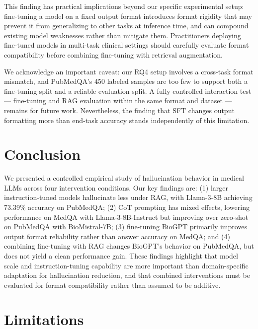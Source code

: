 \documentclass[11pt]{article}
\begin{document}
This finding has practical implications beyond our specific experimental 
setup: fine-tuning a model on a fixed output format introduces format 
rigidity that may prevent it from generalizing to other tasks at 
inference time, and can compound existing model weaknesses rather than 
mitigate them. Practitioners deploying fine-tuned models in multi-task 
clinical settings should carefully evaluate format compatibility before 
combining fine-tuning with retrieval augmentation.

We acknowledge an important caveat: our RQ4 setup involves a 
cross-task format mismatch, and PubMedQA's 450 labeled samples are 
too few to support both a fine-tuning split and a reliable evaluation 
split. A fully controlled interaction test --- fine-tuning and RAG 
evaluation within the same format and dataset --- remains for future 
work. Nevertheless, the finding that SFT changes output formatting more 
than end-task accuracy stands independently of this limitation.

\section{Conclusion}
 
We presented a controlled empirical study of hallucination behavior in 
medical LLMs across four intervention conditions. Our key findings are: 
(1) larger instruction-tuned models hallucinate less under RAG, with 
Llama-3-8B achieving 73.39\% accuracy on PubMedQA; (2) CoT prompting has 
mixed effects, lowering performance on MedQA with Llama-3-8B-Instruct 
but improving over zero-shot on PubMedQA with BioMistral-7B; (3) fine-tuning BioGPT primarily improves output format reliability rather than answer accuracy on MedQA; and (4) combining 
fine-tuning with RAG changes BioGPT's behavior on PubMedQA, but does 
not yield a clean performance gain. These findings highlight that model 
scale and instruction-tuning capability are more important than domain-specific adaptation for hallucination 
reduction, and that combined interventions must be evaluated for format 
compatibility rather than assumed to be additive.

\section{Limitations}
 
\end{document}
